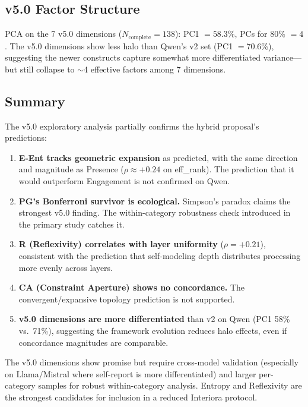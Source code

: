 \documentclass[11pt,a4paper]{article}
\begin{document}
\subsection{v5.0 Factor Structure}

PCA on the 7 v5.0 dimensions ($N_{\text{complete}} = 138$): PC1 $= 58.3\%$, PCs for 80\% $= 4$. The v5.0 dimensions show less halo than Qwen's v2 set (PC1 $= 70.6\%$), suggesting the newer constructs capture somewhat more differentiated variance---but still collapse to $\sim$4 effective factors among 7 dimensions.

\subsection{Summary}

The v5.0 exploratory analysis partially confirms the hybrid proposal's predictions:

\begin{enumerate}
    \item \textbf{E-Ent tracks geometric expansion} as predicted, with the same direction and magnitude as Presence ($\rho \approx +0.24$ on eff\_rank). The prediction that it would outperform Engagement is not confirmed on Qwen.

    \item \textbf{PG's Bonferroni survivor is ecological.} Simpson's paradox claims the strongest v5.0 finding. The within-category robustness check introduced in the primary study catches it.

    \item \textbf{R (Reflexivity) correlates with layer uniformity} ($\rho = +0.21$), consistent with the prediction that self-modeling depth distributes processing more evenly across layers.

    \item \textbf{CA (Constraint Aperture) shows no concordance.} The convergent/expansive topology prediction is not supported.

    \item \textbf{v5.0 dimensions are more differentiated} than v2 on Qwen (PC1 58\% vs.\ 71\%), suggesting the framework evolution reduces halo effects, even if concordance magnitudes are comparable.
\end{enumerate}

The v5.0 dimensions show promise but require cross-model validation (especially on Llama/Mistral where self-report is more differentiated) and larger per-category samples for robust within-category analysis. Entropy and Reflexivity are the strongest candidates for inclusion in a reduced Interiora protocol.
\end{document}
